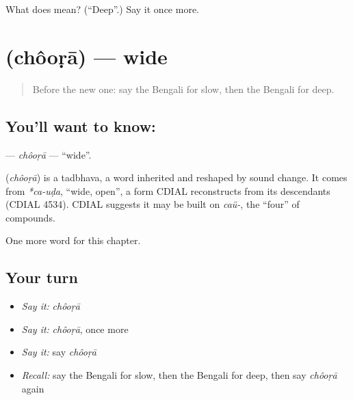 \begin{tcolorbox}[breakable,colback=teal!4,colframe=teal!35!black,title={Before you move on}]
What does  mean? (\textquotedblleft{}Deep\textquotedblright{}.) Say it once more.
\end{tcolorbox}
\section[\texorpdfstring{\bn{চওড়া} (chôoṛā)}{চওড়া (chôoṛā)}]{ (chôoṛā) — wide}

\label{lesson:BN-C136-choora}



\begin{quote}
Before the new one: say the Bengali for slow, then the Bengali for deep.
\end{quote}

\subsection*{You'll want to know: }
\textbf{} — \emph{chôoṛā} — \textquotedblleft{}wide\textquotedblright{}.

\begin{cousinweb}
\textbf{} (\emph{chôoṛā}) is a tadbhava, a word inherited and reshaped by sound change. It comes from \emph{*ca-uḍa}, \textquotedblleft{}wide, open\textquotedblright{}, a form CDIAL reconstructs from its descendants (CDIAL 4534). CDIAL suggests it may be built on \emph{caü-}, the \textquotedblleft{}four\textquotedblright{} of compounds.
\end{cousinweb}

\begin{grammarlens}[title={What you've built}]
One more word for this chapter.
\end{grammarlens}

\subsection*{Your turn}
\begin{itemize}
\raggedright
  \item \emph{Say it:} \emph{chôoṛā}
  \item \emph{Say it:} \emph{chôoṛā}, once more
  \item \emph{Say it:} say \emph{chôoṛā}
  \item \emph{Recall:} say the Bengali for slow, then the Bengali for deep, then say \emph{chôoṛā} again
\end{itemize}

